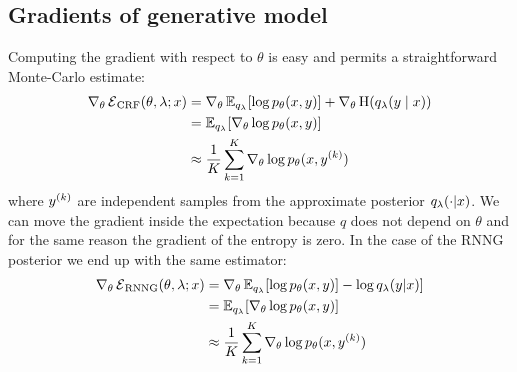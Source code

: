   \subsection{Gradients of generative model}
    Computing the gradient with respect to $\theta$ is easy and permits a straightforward Monte-Carlo estimate:
    \begin{align}
      \nabla_{\theta} \operatorname{\mathcal{E}}_{\text{CRF}}(\theta, \lambda; x)
        &= \nabla_{\theta} \operatorname{\mathbb{E}}_{q_{\lambda}} [ \log p_{\theta}(x, y) ]  + \nabla_{\theta} \operatorname{H}(q_{\lambda}(y \mid x))  \nonumber \\
        &= \operatorname{\mathbb{E}}_{q_{\lambda}} [ \nabla_{\theta} \log p_{\theta}(x, y) ]  \nonumber \\
        &\approx \frac{1}{K}\sum_{k=1}^K  \nabla_{\theta} \log p_{\theta}(x, y^{(k)})
    \end{align}
    where $y^{(k)}$ are independent samples from the approximate posterior $q_{\lambda}( \cdot | x)$. We can move the gradient inside the expectation because $q$ does not depend on $\theta$ and for the same reason the gradient of the entropy is zero. In the case of the RNNG posterior we end up with the same estimator:
    \begin{align}
      \nabla_{\theta} \operatorname{\mathcal{E}}_{\text{RNNG}}(\theta, \lambda; x)
        &= \nabla_{\theta} \operatorname{\mathbb{E}}_{q_{\lambda}} [ \log p_{\theta}(x, y) ]  - \log q_{\lambda}(y | x) ]  \nonumber \\
        &= \operatorname{\mathbb{E}}_{q_{\lambda}} [ \nabla_{\theta} \log p_{\theta}(x, y) ]  \nonumber \\
        &\approx \frac{1}{K}\sum_{k=1}^K  \nabla_{\theta} \log p_{\theta}(x, y^{(k)})
    \end{align}

